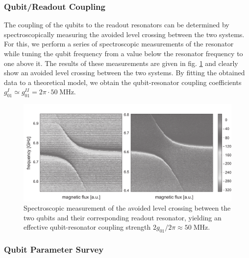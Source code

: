 \subsubsection{Qubit/Readout Coupling}

The coupling of the qubits to the readout resonators can be determined by spectroscopically measuring the avoided level crossing between the two systems. For this, we perform a series of spectroscopic measurements of the resonator while tuning the qubit frequency from a value below the resonator frequency to one above it. The results of these measurements are given in fig. \ref{fig:qubit_resonator_anticrossing} and clearly show an avoided level crossing between the two systems. By fitting the obtained data to a theoretical model, we obtain the qubit-resonator coupling coefficients $g_{01}^I \simeq g_{01}^{II} = 2\pi\cdot 50 \; \mathrm{MHz}$.

\begin{figure}[htb!]
	\centering
	\includegraphics[width=1\textwidth]{"./data/ct5/cavity anticrossing/qubits_anticrossing_bw"}
	\caption[Spectroscopic measurement of the avoided level crossing between the two qubits and their corresponding readout resonator]{Spectroscopic measurement of the avoided level crossing between the two qubits and their corresponding readout resonator, yielding an effective qubit-resonator coupling strength $2g_{01}/2\pi\approx 50\;\mathrm{MHz}$.}
	\label{fig:qubit_resonator_anticrossing}
\end{figure}


\subsubsection{Qubit Parameter Survey}

